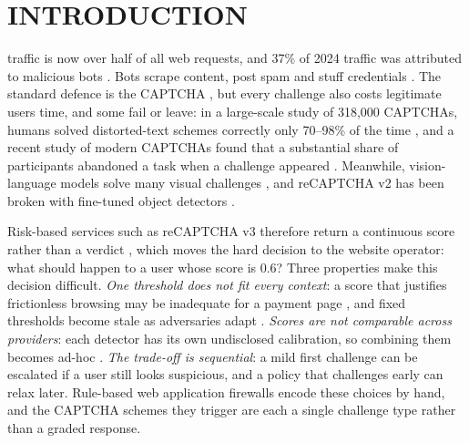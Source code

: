 \documentclass{ieeetj}
\begin{document}
\maketitle

\section{INTRODUCTION}
 traffic is now over half of all web requests, and 37\% of 2024 traffic was attributed to malicious bots \cite{imperva2025}. Bots scrape content, post spam \cite{ferrara2016} and stuff credentials \cite{ba2021}. The standard defence is the CAPTCHA \cite{von_2003,guerar2021}, but every challenge also costs legitimate users time, and some fail or leave: in a large-scale study of 318{,}000 CAPTCHAs, humans solved distorted-text schemes correctly only 70--98\% of the time \cite{bursztein_humans_2010}, and a recent study of modern CAPTCHAs found that a substantial share of participants abandoned a task when a challenge appeared \cite{captcha_study_2023}. Meanwhile, vision-language models solve many visual challenges \cite{qi2026,wu2025mca_bench}, and reCAPTCHA v2 has been broken with fine-tuned object detectors \cite{plesner2024yolo}.

Risk-based services such as reCAPTCHA v3 therefore return a continuous score rather than a verdict \cite{reCAPTCHA}, which moves the hard decision to the website operator: what should happen to a user whose score is 0.6? Three properties make this decision difficult. \emph{One threshold does not fit every context}: a score that justifies frictionless browsing may be inadequate for a payment page \cite{sepczuk_2018}, and fixed thresholds become stale as adversaries adapt \cite{sethi_2018,sivakorn_recaptcha_2016}. \emph{Scores are not comparable across providers}: each detector has its own undisclosed calibration, so combining them becomes ad-hoc \cite{yousef_2023}. \emph{The trade-off is sequential}: a mild first challenge can be escalated if a user still looks suspicious, and a policy that challenges early can relax later. Rule-based web application firewalls \cite{cloudArmour} encode these choices by hand, and the CAPTCHA schemes they trigger are each a single challenge type \cite{umar_2022} rather than a graded response.
\end{document}
